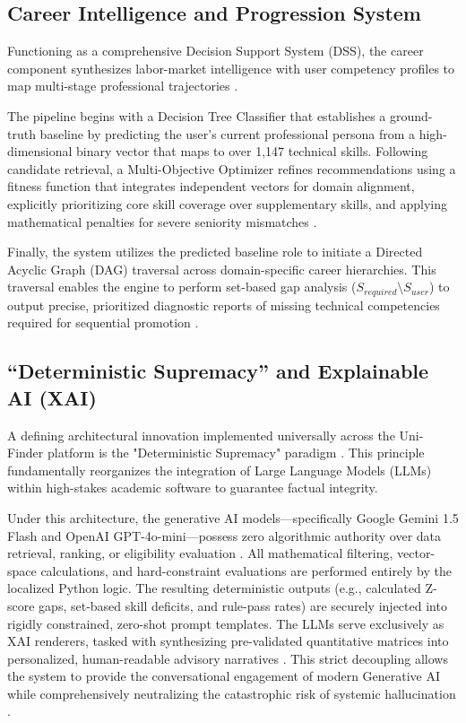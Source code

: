\documentclass[conference]{IEEEtran}
\begin{document}
\subsection{Career Intelligence and Progression System}
Functioning as a comprehensive Decision Support System (DSS), the career component synthesizes labor-market intelligence with user competency profiles to map multi-stage professional trajectories \cite{kardan2024conceptualisation}.

The pipeline begins with a Decision Tree Classifier that establishes a ground-truth baseline by predicting the user's current professional persona from a high-dimensional binary vector that maps to over 1,147 technical skills. Following candidate retrieval, a Multi-Objective Optimizer refines recommendations using a fitness function that integrates independent vectors for domain alignment, explicitly prioritizing core skill coverage over supplementary skills, and applying mathematical penalties for severe seniority mismatches \cite{chen2025integrating}.

Finally, the system utilizes the predicted baseline role to initiate a Directed Acyclic Graph (DAG) traversal across domain-specific career hierarchies. This traversal enables the engine to perform set-based gap analysis ($S_{required} \setminus S_{user}$) to output precise, prioritized diagnostic reports of missing technical competencies required for sequential promotion \cite{wang2023finding}.

\subsection{``Deterministic Supremacy'' and Explainable AI (XAI)}
A defining architectural innovation implemented universally across the Uni-Finder platform is the "Deterministic Supremacy" paradigm \cite{springer2024genai_sl, wang2023finding}. This principle fundamentally reorganizes the integration of Large Language Models (LLMs) within high-stakes academic software to guarantee factual integrity.

Under this architecture, the generative AI models---specifically Google Gemini 1.5 Flash and OpenAI GPT-4o-mini---possess zero algorithmic authority over data retrieval, ranking, or eligibility evaluation \cite{springer2024genai_sl}. All mathematical filtering, vector-space calculations, and hard-constraint evaluations are performed entirely by the localized Python logic. The resulting deterministic outputs (e.g., calculated Z-score gaps, set-based skill deficits, and rule-pass rates) are securely injected into rigidly constrained, zero-shot prompt templates. The LLMs serve exclusively as XAI renderers, tasked with synthesizing pre-validated quantitative matrices into personalized, human-readable advisory narratives \cite{wang2023finding, ieee2026adaptiveui}. This strict decoupling allows the system to provide the conversational engagement of modern Generative AI while comprehensively neutralizing the catastrophic risk of systemic hallucination \cite{springer2024genai_sl}.
\end{document}
